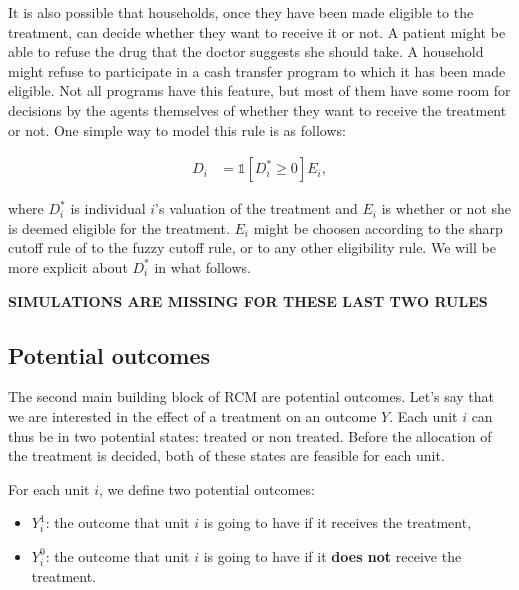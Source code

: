 \documentclass[]{book}
\providecommand{\tightlist}{%
  \setlength{\itemsep}{0pt}\setlength{\parskip}{0pt}}
\newcommand{\uns}[1]{\mathds{1}[ #1 ]}
\theoremstyle{definition}
\theoremstyle{definition}
\theoremstyle{definition}
\theoremstyle{remark}
\let\BeginKnitrBlock\begin \let\EndKnitrBlock\end
\begin{document}
It is also possible that households, once they have been made eligible
to the treatment, can decide whether they want to receive it or not. A
patient might be able to refuse the drug that the doctor suggests she
should take. A household might refuse to participate in a cash transfer
program to which it has been made eligible. Not all programs have this
feature, but most of them have some room for decisions by the agents
themselves of whether they want to receive the treatment or not. One
simple way to model this rule is as follows:

\begin{align}\label{eq:eligself}
  D_i & = \uns{D^*_i\geq0}E_i,
\end{align}

where \(D^*_i\) is individual \(i\)'s valuation of the treatment and
\(E_i\) is whether or not she is deemed eligible for the treatment.
\(E_i\) might be choosen according to the sharp cutoff rule of to the
fuzzy cutoff rule, or to any other eligibility rule. We will be more
explicit about \(D_i^*\) in what follows.

\textbf{SIMULATIONS ARE MISSING FOR THESE LAST TWO RULES}

\subsection{Potential outcomes}\label{potential-outcomes}

The second main building block of RCM are potential outcomes. Let's say
that we are interested in the effect of a treatment on an outcome \(Y\).
Each unit \(i\) can thus be in two potential states: treated or non
treated. Before the allocation of the treatment is decided, both of
these states are feasible for each unit.

\BeginKnitrBlock{definition}[Potential outcomes]
\protect\hypertarget{def:unnamed-chunk-2}{}{\label{def:unnamed-chunk-2}
\iffalse (Potential outcomes) \fi{} }For each unit \(i\), we define two
potential outcomes:
\EndKnitrBlock{definition}

\begin{itemize}
\tightlist
\item
  \(Y_i^1\): the outcome that unit \(i\) is going to have if it receives
  the treatment,
\item
  \(Y_i^0\): the outcome that unit \(i\) is going to have if it
  \textbf{does not} receive the treatment.
\end{itemize}
\end{document}

